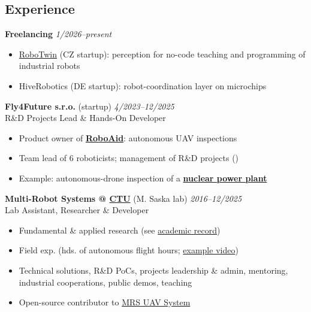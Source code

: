 \documentclass[12pt,a4paper]{article}
\newcommand\Colorhreff[3][reff]{\href{#2}{\color{#1}#3}}
\newcommand{\bluesquare}{\raisebox{0.5ex}{\textcolor{primary}{\rule{0.5ex}{0.5ex}}}}
\newcommand{\parskipsmall}{0.02cm}
\begin{document}
\begin{paracol}{2}
\vspace{-0.5cm}
\section*{Experience}

\textbf{Freelancing} \hfill \textit{1/2026–present}
\begin{itemize}[label=\bluesquare, left=0.5em]
  \item \Colorhreff{https://robotwin.cz/}{RoboTwin} (CZ startup): perception for no-code teaching and programming of industrial robots
  \item HiveRobotics (DE startup): robot-coordination layer on microchips
\end{itemize}

\vspace{\parskipsmall}
\noindent
\textbf{Fly4Future s.r.o.} (startup) \hfill \textit{4/2023–12/2025} \\
R\&D Projects Lead \& Hands-On Developer
\begin{itemize}[label=\bluesquare, left=0.5em]
  \item Product owner of \Colorhreff{https://fly4future.com/custom-drones/roboaid/}{\textbf{RoboAid}}: autonomous UAV inspections
  \item Team lead of 6 roboticists; management of R\&D projects ()
  \item Example: autonomous-drone inspection of a \Colorhreff{https://www.youtube.com/watch?v=1AVGlYE6y9I}{\textbf{nuclear power plant}}
\end{itemize}

\vspace{\parskipsmall}
\noindent
\textbf{Multi-Robot Systems @ \Colorhreff{https://fel.cvut.cz/en}{\textbf{CTU}}} (M. Saska lab) \hfill \textit{2016–12/2025} \\
Lab Assistant, Researcher \& Developer
\begin{itemize}[label=\bluesquare, left=0.5em]
  \item Fundamental \& applied research (see \Colorhreff{https://scholar.google.com/citations?user=IwzN6MQAAAAJ}{academic record})
  \item Field exp. (hds. of autonomous flight hours; \Colorhreff{https://www.youtube.com/watch?v=Gx-mBklSbYc}{example video})
  \item Technical solutions, R\&D PoCs, projects leadership \& admin, mentoring, industrial cooperations, public demos, teaching
  \item Open-source contributor to \Colorhreff{https://github.com/ctu-mrs/mrs_uav_system}{MRS UAV System}
\end{itemize}


\end{paracol}
\end{document}
